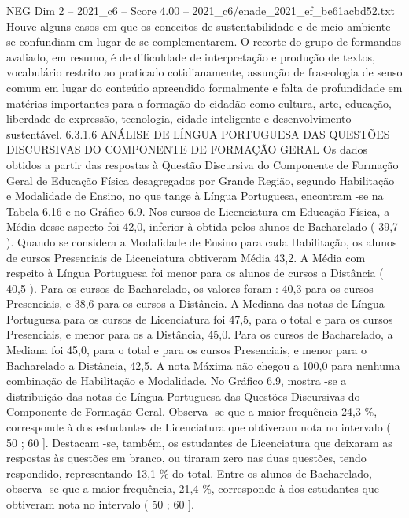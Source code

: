 \begin{textsample}{NEG Dim 2 – 2021\_c6 – Score 4.00 – 2021\_c6/enade\_2021\_ef\_be61acbd52.txt}
Houve alguns casos em que os conceitos de sustentabilidade e de meio ambiente se confundiam em lugar de se complementarem.
O recorte do grupo de formandos avaliado, em resumo, é de dificuldade de interpretação e produção de textos, vocabulário restrito ao praticado cotidianamente, assunção de fraseologia de senso comum em lugar do conteúdo apreendido formalmente e falta de profundidade em matérias importantes para a formação do cidadão como cultura, arte, educação, liberdade de expressão, tecnologia, cidade inteligente e desenvolvimento sustentável. 6.3.1.6 ANÁLISE DE LÍNGUA PORTUGUESA DAS QUESTÕES DISCURSIVAS DO COMPONENTE DE FORMAÇÃO GERAL Os dados obtidos a partir das respostas à Questão Discursiva do Componente de Formação Geral de Educação Física desagregados por Grande Região, segundo Habilitação e Modalidade de Ensino, no que tange à Língua Portuguesa, encontram -se na Tabela 6.16 e no Gráfico 6.9.
Nos cursos de Licenciatura em Educação Física, a Média desse aspecto foi 42,0, inferior à obtida pelos alunos de Bacharelado ( 39,7 ).
Quando se considera a Modalidade de Ensino para cada Habilitação, os alunos de cursos Presenciais de Licenciatura obtiveram Média 43,2.
A Média com respeito à Língua Portuguesa foi menor para os alunos de cursos a Distância ( 40,5 ).
Para os cursos de Bacharelado, os valores foram : 40,3 para os cursos Presenciais, e 38,6 para os cursos a Distância.
A Mediana das notas de Língua Portuguesa para os cursos de Licenciatura foi 47,5, para o total e para os cursos Presenciais, e menor para os a Distância, 45,0.
Para os cursos de Bacharelado, a Mediana foi 45,0, para o total e para os cursos Presenciais, e menor para o Bacharelado a Distância, 42,5.
A nota Máxima não chegou a 100,0 para nenhuma combinação de Habilitação e Modalidade.
No Gráfico 6.9, mostra -se a distribuição das notas de Língua Portuguesa das Questões Discursivas do Componente de Formação Geral.
Observa -se que a maior frequência 24,3 \%, corresponde à dos estudantes de Licenciatura que obtiveram nota no intervalo ( 50 ; 60 ].
Destacam -se, também, os estudantes de Licenciatura que deixaram as respostas às questões em branco, ou tiraram zero nas duas questões, tendo respondido, representando 13,1 \% do total.
Entre os alunos de Bacharelado, observa -se que a maior frequência, 21,4 \%, corresponde à dos estudantes que obtiveram nota no intervalo ( 50 ; 60 ].

\end{textsample}
